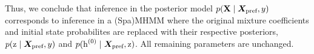 Thus, we conclude that inference in the posterior model $p({\mathbf{X}} \mid {\bm{X}}_\text{pref}, y)$ corresponds to inference in a (Spa)MHMM where the original mixture coefficients and initial state probabilites are replaced with their respective posteriors, $p({\textnormal{z}} \mid {\bm{X}}_\text{pref}, y)$ and $p({\textnormal{h}}^{(0)} \mid {\bm{X}}_\text{pref}, {\textnormal{z}})$. All remaining parameters are unchanged.